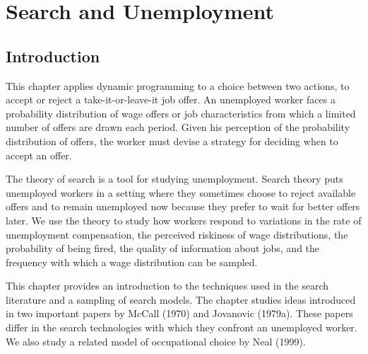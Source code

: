 

%

\def\th{{\theta}}

%
%
\def\lege{\raise.3ex\hbox{$>$\kern-.75em\lower1ex\hbox{$<$}}}
\def\be{{\beta}}
\chapter{Search and Unemployment\label{search1}}

\section{Introduction}

This chapter applies dynamic programming to a choice between
 two actions, to accept or reject a take-it-or-leave-it
job offer.  An unemployed worker faces a probability distribution
of wage offers or job characteristics from which a limited
number of offers are drawn each period.  Given his perception
of the probability distribution of offers, the worker must
devise a strategy for deciding when to accept an offer.

The theory of search is a tool for studying unemployment.
Search theory puts unemployed workers in a setting where
they  sometimes choose   to reject available offers and to remain
unemployed now because they prefer to wait for better offers later.
We use the theory to study how workers respond
to variations in the rate of unemployment compensation,
the perceived riskiness of wage distributions, the probability of
being fired, the quality of
information about jobs, and the frequency with which a wage
distribution can be sampled.


This chapter provides an introduction to the techniques used in
the search literature and a sampling of search models.  The chapter
studies ideas introduced in two important papers by McCall
(1970) and Jovanovic (1979a).  These papers differ in the search technologies
with which they confront an unemployed worker.
We also study a related model of occupational choice by Neal (1999).


